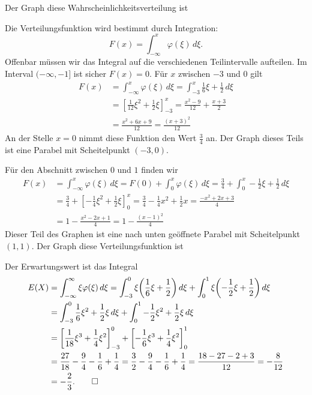 \begin{loesung}
\begin{teilaufgaben}
\item
Der Graph diese Wahrscheinlichkeitsverteilung ist
\begin{center}
\end{center}
\item Die Verteilungsfunktion wird bestimmt durch Integration:
\[
F(x)=\int_{-\infty}^x\varphi(\xi)\,d\xi.
\]
Offenbar müssen wir das Integral auf die verschiedenen Teilintervalle
aufteilen. Im Interval $(-\infty,-1]$ ist sicher $F(x)=0$. Für $x$ zwischen
$-3$ und $0$ gilt
\begin{align*}
F(x)&=\int_{-\infty}^x\varphi(\xi)\,d\xi =\int_{-3}^x\frac16\xi+\frac12\,d\xi
\\
&=
\left[\frac1{12}\xi^2+\frac12\xi\right]_{-3}^x=\frac{x^2-9}{12}+\frac{x+3}2
\\
&
=\frac{x^2+6x+9}{12}=\frac{(x+3)^2}{12}
\end{align*}
An der Stelle $x=0$ nimmt diese Funktion den Wert $\frac34$ an.
Der Graph dieses Teils ist eine Parabel mit Scheitelpunkt $(-3,0)$.

Für den Abschnitt zwischen $0$ und $1$ finden wir
\begin{align*}
F(x)
&=
\int_{-\infty}^x\varphi(\xi)\,d\xi
=F(0)+\int_0^x\varphi(\xi)\,d\xi
=\frac34+\int_0^x-\frac12\xi+\frac12\,d\xi\\
&=\frac34+\left[-\frac14\xi^2+\frac12\xi\right]_0^x
=\frac34-\frac14x^2+\frac12x
=\frac{-x^2+2x+3}4\\
&=1-\frac{x^2-2x+1}{4}
=1-\frac{(x-1)^2}4
\end{align*}
Dieser Teil des Graphen ist eine nach unten geöffnete Parabel mit
Scheitelpunkt $(1,1)$.
Der Graph diese Verteilungsfunktion ist
\begin{center}
\end{center}
\item
Der Erwartungswert ist das Integral
\begin{align*}
E(X)&=\int_{-\infty}^\infty\xi\varphi(\xi)\,d\xi
=
\int_{-3}^0\xi\biggl(\frac16\xi+\frac12\biggr)\,d\xi
+\int_0^1\xi\biggl(-\frac12\xi+\frac12\biggr)\,d\xi
\\
&=
\int_{-3}^0\frac16\xi^2+\frac12\xi\,d\xi
+\int_0^1-\frac12\xi^2+\frac12\xi\,d\xi
\\
&=\left[\frac1{18}\xi^3+\frac14\xi^2\right]_{-3}^0
+\left[-\frac16\xi^3+\frac14\xi^2\right]_0^1\\
&=\frac{27}{18}-\frac94-\frac16+\frac14
=\frac{3}{2}-\frac94-\frac16+\frac14
=\frac{18-27-2+3}{12}
=-\frac{8}{12}
\\
&=-\frac23.
\qedhere
\end{align*}
\end{teilaufgaben}
\end{loesung}
